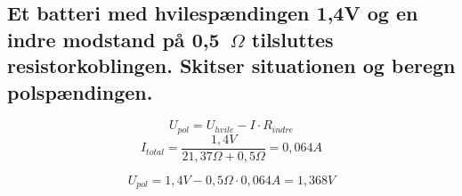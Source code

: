 \subsection{Et batteri med hvilespændingen 1,4V og en indre modstand på 0,5~$\Omega$ tilsluttes resistorkoblingen. Skitser situationen og beregn polspændingen.}
\begin{equation*}
    U_{pol}=U_{hvile}-I\cdot R_{indre}
\end{equation*}
\begin{equation*}
    I_{total}=\frac{1,4V}{21,37\Omega+0,5\Omega}=0,064A
\end{equation*}

\begin{equation*}
    U_{pol}=1,4V-0,5\Omega\cdot 0,064A=1,368V
\end{equation*}
\newpage
